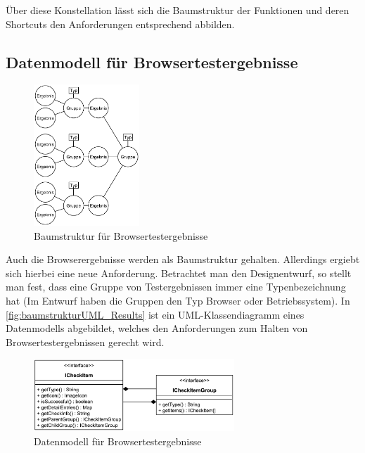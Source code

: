 Über diese Konstellation lässt sich die Baumstruktur der Funktionen und deren Shortcuts den Anforderungen entsprechend abbilden.

\newpage

\subsection{Datenmodell für Browsertestergebnisse}

\begin{figure}
	\includegraphics[width=150px]{../graphic/diagrams/Baumstruktur_Results/Baumstruktur}
	\caption{Baumstruktur für Browsertestergebnisse}
	\label{fig:baumstruktur_Result}
\end{figure}

Auch die Browserergebnisse werden als Baumstruktur gehalten. Allerdings ergiebt sich hierbei eine neue Anforderung. Betrachtet man den Designentwurf, so stellt man fest, dass eine Gruppe von Testergebnissen immer eine Typenbezeichnung hat (Im Entwurf haben die Gruppen den Typ \glqq Browser\grqq\xspace oder \glqq Betriebssystem\grqq). In \autoref{fig:baumstrukturUML_Results} ist ein UML-Klassendiagramm eines Datenmodells abgebildet, welches den Anforderungen zum Halten von Browsertestergebnissen gerecht wird.

\begin{figure}[H]
	\flushright
	\includegraphics[width=285px]{../graphic/diagrams/CD_Baumstruktur_Results/Baumstruktur}
	\captionsetup{width=235px, justification=raggedleft}
	\caption{Datenmodell für Browsertestergebnisse}
	\label{fig:baumstrukturUML_Results}
\end{figure}

